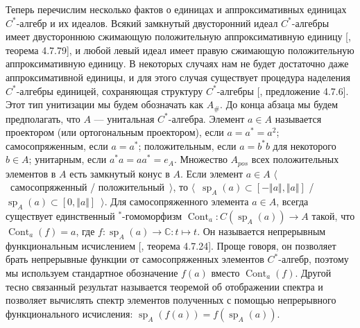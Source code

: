 Теперь перечислим несколько фактов о единицах и аппроксимативных единицах
$C^*$-алгебр и их идеалов. Всякий замкнутый двусторонний идеал $C^*$-алгебры
имеет двустороннюю сжимающую положительную аппроксимативную единицу
[\cite{HelBanLocConvAlg}, теорема 4.7.79], и любой левый идеал  имеет правую
сжимающую положительную аппроксимативную единицу. В некоторых случаях нам не
будет достаточно даже аппроксимативной единицы, и для этого случая существует
процедура наделения $C^*$-алгебры единицей, сохраняющая структуру $C^*$-алгебры
[\cite{HelBanLocConvAlg}, предложение 4.7.6]. Этот тип унитизации мы будем
обозначать как $A_\#$. До конца абзаца мы будем предполагать, что $A$ ---
унитальная $C^*$-алгебра. Элемент $a\in A$ называется проектором (или
ортогональным проектором), если $a=a^*=a^2$; самосопряженным, если $a=a^*$;
положительным, если $a=b^*b$ для некоторого $b\in A$; унитарным, если
$a^*a=aa^*=e_A$. Множество $A_{pos}$ всех положительных элементов в $A$ есть
замкнутый конус в $A$. Если элемент $a\in A$ $\langle$~самосопряженный /
положительный~$\rangle$, то 
$\langle$~$\operatorname{sp}_A(a)\subset[-\Vert a\Vert, \Vert a\Vert]$ / 
$\operatorname{sp}_A(a)\subset[0,\Vert a\Vert]$~$\rangle$. 
Для самосопряженного элемента $a\in A$, всегда существует
единственный ${}^*$-гомоморфизм
$\operatorname{Cont}_a:C(\operatorname{sp}_A(a))\to A$ такой, что
$\operatorname{Cont}_a(f)=a$, где
$f:\operatorname{sp}_A(a)\to\mathbb{C}:t\mapsto t$. Он называется непрерывным
функциональным исчислением [\cite{HelBanLocConvAlg}, теорема 4.7.24]. Проще
говоря, он позволяет брать непрерывные функции от самосопряженных элементов
$C^*$-алгебр, поэтому мы используем стандартное обозначение $f(a)$ вместо
$\operatorname{Cont}_a(f)$. Другой тесно связанный результат называется теоремой
об отображении спектра и позволяет вычислять спектр элементов полученных с
помощью непрерывного функционального исчисления:
$\operatorname{sp}_A(f(a))=f(\operatorname{sp}_A(a))$. 

